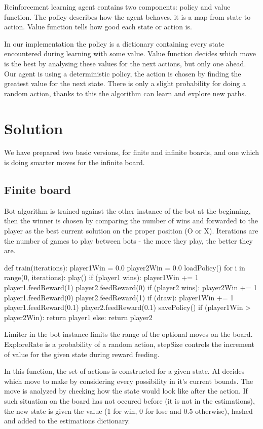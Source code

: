 \documentclass[a4paper,12pt]{book}
\begin{document}
Reinforcement learning agent contains two components: policy and value function. The policy describes how the agent behaves, it is a map from state to action. Value function tells how good each state or action is. 

In our implementation the policy is a dictionary containing every state encountered during learning with some value. Value function decides which move is the best by analysing these values for the next actions, but only one ahead. Our agent is using a deterministic policy, the action is chosen by finding the greatest value for the next state. There is only a slight probability for doing a random action, thanks to this the algorithm can learn and explore new paths.


	\chapter{Solution}

We have prepared two basic versions, for finite and infinite boards, and one which is doing smarter moves for the infinite board.

	\section{Finite board}
Bot algorithm is trained against the other instance of the bot at the beginning, then the winner is chosen by comparing the number of wins and forwarded to the player as the best current solution on the proper position (O or X). Iterations are the number of games to play between bots - the more they play, the better they are.
	
\begin{python}
def train(iterations):
	player1Win = 0.0
	player2Win = 0.0
	loadPolicy()
	for i in range(0, iterations):
		play()
		if (player1 wins):
			player1Win += 1
			player1.feedReward(1)
			player2.feedReward(0)
		if (player2 wins):
			player2Win += 1
			player1.feedReward(0)
			player2.feedReward(1)
		if (draw):
			player1Win += 1
			player1.feedReward(0.1)
			player2.feedReward(0.1)
	savePolicy()
	if (player1Win > player2Win):
		return player1
	else:
		return player2
\end{python}

Limiter in the bot instance limits the range of the optional moves on the board. ExploreRate is a probability of a random action, stepSize controls the increment of value for the given state during reward feeding. 

In this function, the set of actions is constructed for a given state. AI decides which move to make by considering every possibility in it's current bounds. The move is analyzed by checking how the state would look like after the action. If such situation on the board has not occured before (it is not in the estimations), the new state is given the value (1 for win, 0 for lose and 0.5 otherwise), hashed and added to the estimations dictionary.
\end{document}
